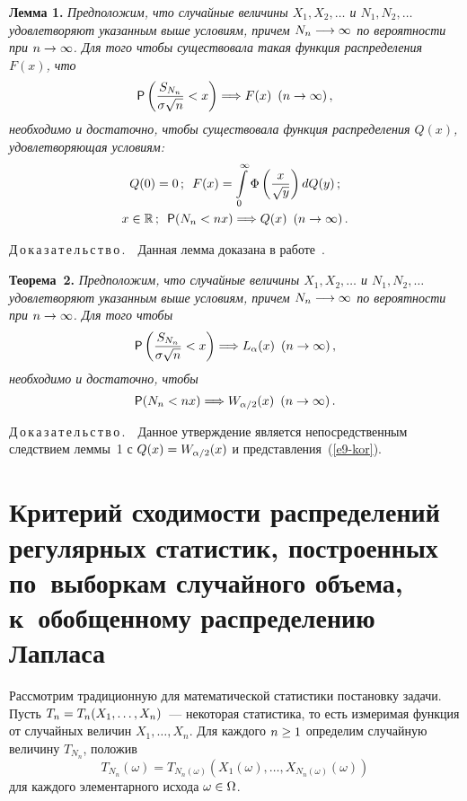 \begin{multicols}{2}
\smallskip

\noindent
\textbf{Лемма 1.} {\it Предположим, что случайные величины
$X_1,X_2,\ldots$ и $N_1,N_2,\ldots$ удовлетворяют указанным выше
условиям, причем $N_n\hm\longrightarrow\infty$ по вероятности при
$n\hm\to\infty$. Для того чтобы существовала такая функция
распределения~$F(x)$, что}
$$
{\sf P}\left(\displaystyle\frac{\displaystyle S_{N_n}\mathstrut}{\displaystyle \sigma\sqrt{n}\mathstrut}<x\right) \Longrightarrow
F(x)\enskip (n\to\infty)\,,
$$
\textit{необходимо и достаточно, чтобы существовала функция распределения
$Q(x)$, удовлетворяющая условиям:}
\begin{gather*}
Q(0)=0\,;\enskip
F(x)=\int\limits_{0}^{\infty}\Phi\left(\displaystyle\frac{\displaystyle x\mathstrut}{\displaystyle \sqrt{y}\mathstrut}\right)dQ(y)\,;\\
x\in\mathbb{R}\,;\enskip {\sf P}(N_n<nx)\Longrightarrow Q(x) \enskip
(n\to\infty)\,.
\end{gather*}


\smallskip

\noindent
Д\,о\,к\,а\,з\,а\,т\,е\,л\,ь\,с\,т\,в\,о\,.\ \ Данная лемма доказана в работе~\cite{Korolev1994}.

\smallskip

\noindent
\textbf{Теорема~2.} {\it Предположим, что случайные величины
$X_1,X_2,\ldots$ и $N_1,N_2,\ldots$ удовлетворяют указанным выше
условиям, причем $N_n\hm\longrightarrow\infty$ по вероятности при
$n\hm\to\infty$. Для того чтобы}
$$
{\sf P}\left(\displaystyle\frac{\displaystyle S_{N_n}\mathstrut}{\displaystyle \sigma\sqrt{n}\mathstrut}<x\right) \Longrightarrow
L_{\alpha}(x)\enskip (n\to\infty)\,,
$$
\textit{необходимо и достаточно, чтобы}
$$
{\sf P}(N_n<nx)\Longrightarrow W_{\alpha/2}(x) \enskip (n\to\infty)\,.
$$



\noindent
Д\,о\,к\,а\,з\,а\,т\,е\,л\,ь\,с\,т\,в\,о\,.\ \ Данное утверждение является
непосредственным следствием леммы~1 с $Q(x)\hm=W_{\alpha/2}(x)$ и
представления~(\ref{e9-kor}).

\vspace*{-4pt}

\section{Критерий сходимости распределений регулярных статистик,
построенных по~выборкам случайного объема, к~обобщенному
распределению Лапласа}

\vspace*{-1pt}

Рассмотрим традиционную для математической статистики постановку
задачи. Пусть $T_n\hm=T_n(X_1,\ldots,X_n)$~--- некоторая статистика, то
есть измеримая функция от случайных величин $X_1,\ldots,X_n$. Для
каждого $n\hm\ge1$ определим случайную величину $T_{N_n}$, положив
$$
T_{N_n}(\omega) = T_{N_n(\omega)}\left(X_1(\omega),\ldots,X_{N_n(\omega)}(\omega)\right)
$$
для каждого элементарного исхода $\omega\hm\in\Omega$.


\end{multicols}
